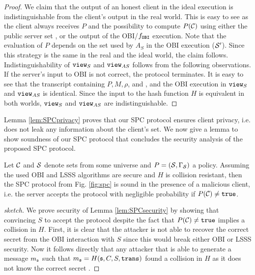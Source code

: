 \begin{proof}
We claim that the output of an honest client in the ideal execution is indistinguishable from the client's output in the real world.
This is easy to see as the client always receives $P$ and the possibility to compute $P(\mathcal{C})$ using either the public server set \cS, or the output of the OBI/$f_\mathtt{OBI}$ execution.
Note that the evaluation of $P$ depends on the set used by $A_S$ in the OBI execution ($\mathcal{S}'$).
Since this strategy is the same in the real and the ideal world, the claim follows.
Indistinguishability of $\mathtt{view}_S$ and $\mathtt{view}_{AS}$ follows from the following observations.
If the server's input to OBI is not correct, the protocol terminates.
It is easy to see that the transcript containing $P, M, \rho$, and \cS, and the OBI execution in $\mathtt{view}_S$ and $\mathtt{view}_{AS}$ is identical.
Since the input to the hash function $H$ is equivalent in both worlds, $\mathtt{view}_S$ and $\mathtt{view}_{AS}$ are indistinguishable.

\end{proof}

\noindent
Lemma \ref{lem:SPCprivacy} proves that our SPC protocol ensures client privacy, i.e. does not leak any information about the client's set.
We now give a lemma to show soundness of our SPC protocol that concludes the security analysis of the proposed SPC protocol.

\begin{lemma}[Soundness]\label{lem:SPCsecurity}
  Let $\mathcal{C}$ and $\mathcal{S}$ denote sets from some universe and $P=(\mathcal{S},\Gamma_\mathcal{S})$ a policy.
  Assuming the used OBI and LSSS algorithms are secure and $H$ is collision resistant, then the SPC protocol from Fig. \ref{fig:spc} is sound in the presence of a malicious client, i.e. the server accepts the protocol with negligible probability if $P(\mathcal{C})\not=\mathtt{true}$.
\end{lemma}

\begin{proof}[sketch]
We prove security of Lemma \ref{lem:SPCsecurity} by showing that convincing $S$ to accept the protocol despite the fact that $P(\mathcal{C})\not=\mathtt{true}$ implies a collision in $H$.
First, it is clear that the attacker is not able to recover the correct secret \secret from the OBI interaction with $S$ since this would break either OBI or LSSS security.
Now it follows directly that any attacker that is able to generate a message $m_\mathfrak{s}$ such that $m_\mathfrak{s}=H(\mathfrak{s},C,S,\mathtt{trans})$ found a collision in $H$ as it does not know the correct secret \secret.

\end{proof}


